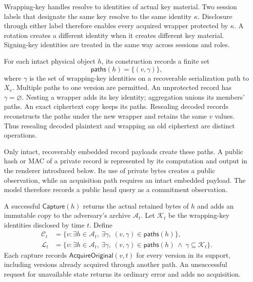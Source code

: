 Wrapping-key handles resolve to identities of actual key material.  Two
session labels that designate the same key resolve to the same identity
$\kappa$.  Disclosure through either label therefore enables every acquired
wrapper protected by $\kappa$.  A rotation creates a different identity when
it creates different key material.  Signing-key identities are treated in
the same way across sessions and roles.

For each intact physical object $h$, its construction records a finite set
\[
  \mathsf{paths}(h)=\{(v,\gamma)\},
\]
where $\gamma$ is the set of wrapping-key identities on a recoverable
serialization path to $X_v$.  Multiple paths to one version are permitted.
An unprotected record has $\gamma=\varnothing$.  Nesting a wrapper adds its
key identity; aggregation unions its members' paths.  An exact ciphertext
copy keeps its paths.  Resealing decoded records reconstructs the paths under
the new wrapper and retains the same $v$ values.  Thus resealing decoded
plaintext and wrapping an old ciphertext are distinct operations.

Only intact, recoverably embedded record payloads create these paths.  A
public hash or MAC of a private record is represented by its computation and
output in the renderer introduced below. Its use of private bytes creates a
public observation, while an acquisition path requires an intact embedded
payload. The model therefore records a public head query as a commitment
observation.

\begin{definition}
\label{def:record-acquisition}
A successful $\mathsf{Capture}(h)$ returns the actual retained bytes of $h$
and adds an immutable copy to the adversary's archive $\mathcal A_t$.
Let $\mathcal K_t$ be the wrapping-key identities disclosed by time $t$.
Define
\begin{align}
  \mathcal C_t
    &=\{v:\exists h\in\mathcal A_t,\ \exists\gamma,\
                    (v,\gamma)\in\mathsf{paths}(h)\}, \label{eq:acquired-records}\\
  \mathcal L_t
    &=\{v:\exists h\in\mathcal A_t,\ \exists\gamma,\
          (v,\gamma)\in\mathsf{paths}(h)
          \ \wedge\ \gamma\subseteq\mathcal K_t\}.
          \label{eq:readable-records}
\end{align}
Each capture records $\mathsf{AcquireOriginal}(v,t)$ for every version in its
support, including versions already acquired through another path.
An unsuccessful request for unavailable state returns its ordinary error and
adds no acquisition.
\end{definition}

